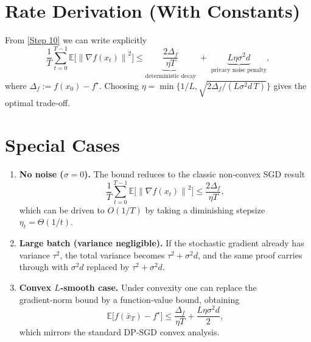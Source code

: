 \documentclass{article}
\newcommand{\E}{\mathbb{E}}
\newcommand{\norm}[1]{\left\lVert#1\right\rVert}
\begin{document}
\section*{Rate Derivation (With Constants)}
From \eqref{Step 10} we can write explicitly
\[
\boxed{
\frac{1}{T}\sum_{t=0}^{T-1}\E\!\bigl[\norm{\nabla f(x_t)}^{2}\bigr]
\le
\underbrace{\frac{2\Delta_f}{\eta T}}_{\text{deterministic decay}}
\;+\;
\underbrace{L\eta\sigma^{2}d}_{\text{privacy noise penalty}},
}
\]
where $\Delta_f:=f(x_0)-f^{\star}$.
Choosing $\eta = \min\!\bigl\{1/L,\sqrt{2\Delta_f/(L\sigma^{2}d\,T)}\bigr\}$ gives the optimal trade‑off.

\section*{Special Cases}
\begin{enumerate}
\item \textbf{No noise ($\sigma=0$).} The bound reduces to the classic non‑convex SGD result
\[
\frac{1}{T}\sum_{t=0}^{T-1}\E\!\bigl[\norm{\nabla f(x_t)}^{2}\bigr]
\le \frac{2\Delta_f}{\eta T},
\]
which can be driven to $O(1/T)$ by taking a diminishing stepsize $\eta_t = \Theta(1/t)$.
\item \textbf{Large batch (variance negligible).} If the stochastic gradient already has variance $\tau^{2}$, the total variance becomes $\tau^{2}+\sigma^{2}d$, and the same proof carries through with $\sigma^{2}d$ replaced by $\tau^{2}+\sigma^{2}d$.
\item \textbf{Convex $L$‑smooth case.} Under convexity one can replace the gradient‑norm bound by a function‑value bound, obtaining
\[
\E\bigl[f(\bar x_T)-f^{\star}\bigr]
\le \frac{\Delta_f}{\eta T}+ \frac{L\eta\sigma^{2}d}{2},
\]
which mirrors the standard DP‑SGD convex analysis.
\end{enumerate}
\end{document}
